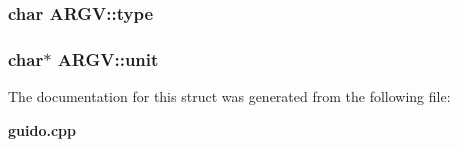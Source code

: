 \subsubsection{\setlength{\rightskip}{0pt plus 5cm}char {\bf ARGV::type}}\label{structARGV_o0}


\subsubsection{\setlength{\rightskip}{0pt plus 5cm}char$\ast$ {\bf ARGV::unit}}\label{structARGV_o5}




The documentation for this struct was generated from the following file:\begin{CompactItemize}
\item 
{\bf guido.cpp}\end{CompactItemize}

